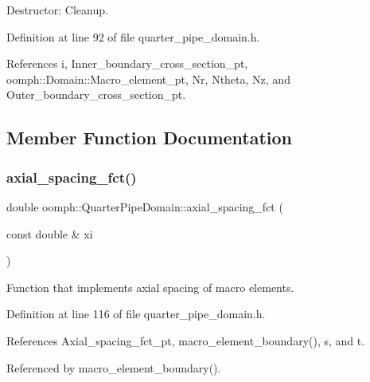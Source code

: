 Destructor\+: Cleanup. 



Definition at line 92 of file quarter\+\_\+pipe\+\_\+domain.\+h.



References i, Inner\+\_\+boundary\+\_\+cross\+\_\+section\+\_\+pt, oomph\+::\+Domain\+::\+Macro\+\_\+element\+\_\+pt, Nr, Ntheta, Nz, and Outer\+\_\+boundary\+\_\+cross\+\_\+section\+\_\+pt.



\subsection{Member Function Documentation}
\mbox{\label{classoomph_1_1QuarterPipeDomain_a035e27884c0fa1bc31d1d9bed28c37bd}} 
\subsubsection{\texorpdfstring{axial\+\_\+spacing\+\_\+fct()}{axial\_spacing\_fct()}}
{\footnotesize\ttfamily double oomph\+::\+Quarter\+Pipe\+Domain\+::axial\+\_\+spacing\+\_\+fct (\begin{DoxyParamCaption}\item[{const double \&}]{xi }\end{DoxyParamCaption})\hspace{0.3cm}{\ttfamily [inline]}}



Function that implements axial spacing of macro elements. 



Definition at line 116 of file quarter\+\_\+pipe\+\_\+domain.\+h.



References Axial\+\_\+spacing\+\_\+fct\+\_\+pt, macro\+\_\+element\+\_\+boundary(), s, and t.



Referenced by macro\+\_\+element\+\_\+boundary().

\mbox{\label{classoomph_1_1QuarterPipeDomain_aa2731d4c5fb22dc0a5d2faa32f99505e}} 
